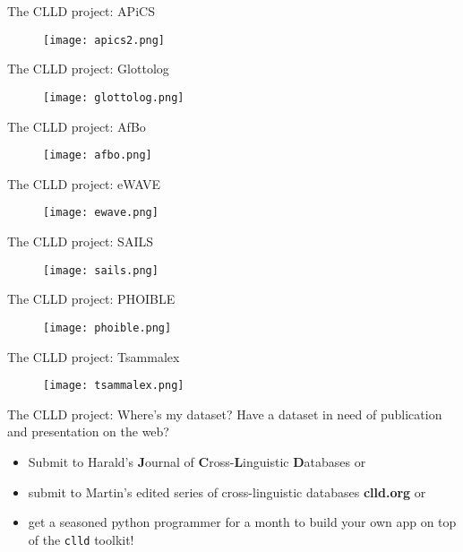 \documentclass{beamer}
\begin{document}
\begin{frame}{The CLLD project: APiCS}
\begin{figure}
\texttt{[image: apics2.png]}
\end{figure}
\end{frame}

\begin{frame}{The CLLD project: Glottolog}
\begin{figure}
\texttt{[image: glottolog.png]}
\end{figure}
\end{frame}

\begin{frame}{The CLLD project: AfBo}
\begin{figure}
\texttt{[image: afbo.png]}
\end{figure}
\end{frame}

\begin{frame}{The CLLD project: eWAVE}
\begin{figure}
\texttt{[image: ewave.png]}
\end{figure}
\end{frame}

\begin{frame}{The CLLD project: SAILS}
\begin{figure}
\texttt{[image: sails.png]}
\end{figure}
\end{frame}

\begin{frame}{The CLLD project: PHOIBLE}
\begin{figure}
\texttt{[image: phoible.png]}
\end{figure}
\end{frame}

\begin{frame}{The CLLD project: Tsammalex}
\begin{figure}
\texttt{[image: tsammalex.png]}
\end{figure}
\end{frame}


\begin{frame}[fragile]{The CLLD project: Where's my dataset?}
Have a dataset in need of publication and presentation on the web?
\begin{itemize}
\item Submit to Harald's \textbf{J}ournal of \textbf{C}ross-\textbf{L}inguistic \textbf{D}atabases or
\item submit to Martin's edited series of cross-linguistic databases \textbf{clld.org} or
\item get a seasoned python programmer for a month to build your own app on top of the
\texttt{clld} toolkit!

\end{itemize}
\end{frame}
\end{document}
